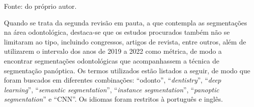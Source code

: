 \begin{table}[H]
    \centering
    \caption{Trabalhos selecionados a partir da revisão sobre segmentação panóptica.}
    \label{proposal:revision:tab:1}

    \vspace*{1 cm}
    Fonte: do próprio autor.
\end{table}

Quando se trata da segunda revisão em pauta, a que contempla as segmentações na área odontológica, destaca-se que os estudos procurados também não se limitaram ao tipo, incluindo congressos, artigos de revista, entre outros, além de utilizarem o intervalo dos anos de 2019 a 2022 como métrica, de modo a encontrar segmentações odontológicas que acompanhassem a técnica de segmentação panóptica. Os termos utilizados estão listados a seguir, de modo que foram buscados em diferentes combinações: ``odonto'', ``\textit{dentistry}'', ``\textit{deep learning}'', ``\textit{semantic segmentation}'', ``\textit{instance segmentation}'', ``\textit{panoptic segmentation}'' e ``CNN''. Os idiomas foram restritos à português e inglês.

